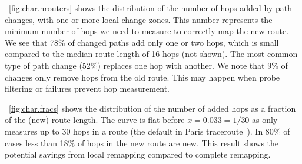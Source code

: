

\figstr~\ref{fig:char.nrouters} shows the distribution of the number of
hops added by path changes, with one or more local change zones.  This
number represents the minimum number of hops we need to measure to
correctly map the new route.  We see that 78\% of changed paths add only
one or two hops, which is small compared to the median route length of
16 hops (not shown).  The most common type of path change (52\%)
replaces one hop with another.  We note that 9\% of changes only remove
hops from the old route. This may happen when probe filtering or
failures prevent hop measurement.




\figstr~\ref{fig:char.fracs} shows the distribution of the number of
added hops as a fraction of the (new) route length.  The curve is flat
before $x = 0.033 = 1/30$ as \dtrack{} only measures up to 30 hops in a
route (the default in Paris traceroute~\cite{veitch09balancer}).  In
80\% of cases less than 18\% of hops in the new route are new.  This
result shows the potential savings from local remapping compared to
complete remapping.


